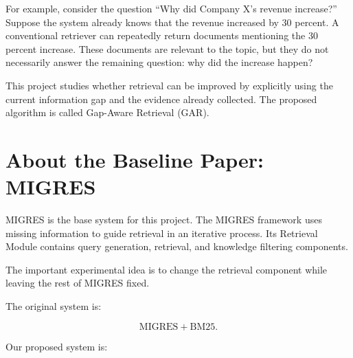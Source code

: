 \documentclass[11pt,a4paper]{article}
\begin{document}
For example, consider the question ``Why did Company X's revenue increase?'' Suppose the system already knows that the revenue increased by 30 percent. A conventional retriever can repeatedly return documents mentioning the 30 percent increase. These documents are relevant to the topic, but they do not necessarily answer the remaining question: why did the increase happen?

This project studies whether retrieval can be improved by explicitly using the current information gap and the evidence already collected. The proposed algorithm is called Gap-Aware Retrieval (GAR).


\section{About the Baseline Paper: MIGRES}

MIGRES is the base system for this project. The MIGRES framework uses missing information to guide retrieval in an iterative process. Its Retrieval Module contains query generation, retrieval, and knowledge filtering components.

The important experimental idea is to change the retrieval component while leaving the rest of MIGRES fixed.

\begin{center}
\end{center}


The original system is:

\[
\text{MIGRES}+\text{BM25}.
\]

Our proposed system is:
\end{document}

